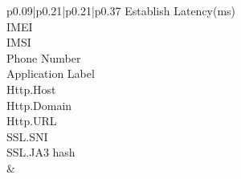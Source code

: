 \begin{description}
\begin{longtable}{p{}|p{}|p{}|p{}}
{                                                                                                    Establish Latency(ms)\\
                                                                                                    IMEI\\
                                                                                                    IMSI\\
                                                                                                    Phone Number\\
                                                                                                    Application Label\\
                                                                                                    Http.Host\\
                                                                                                    Http.Domain\\
                                                                                                    Http.URL\\
                                                                                                    SSL.SNI\\
                                                                                                    SSL.JA3 hash}  \\ \hline 
         & 
\end{longtable}
\end{description}
